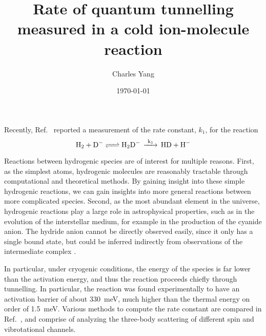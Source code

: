 \documentclass[reprint,aps,prb]{revtex4-2} %
\begin{document}
\title{Rate of quantum tunnelling measured in a cold ion-molecule reaction}
\author{Charles Yang\vspace{-2.6em}}
\noaffiliation{}
\date{\today}
\maketitle


Recently, Ref.~ reported a measurement of the rate constant, \( k_1 \), for the reaction 
\begin{equation}
    \ce{H2 + D- <=> H2D- \overset{k_1}{\ce{->}} HD + H-} \label{eq:rxn}
\end{equation}

Reactions between hydrogenic species are of interest for multiple reasons. First, as the simplest atoms, hydrogenic molecules are reasonably tractable through computational and theoretical methods. By gaining insight into these simple hydrogenic reactions, we can gain insights into more general reactions between more complicated species. Second, as the most abundant element in the universe, hydrogenic reactions play a large role in astrophysical properties, such as in the evolution of the interstellar medium, for example in the production of the cyanide anion\cite{yuen_quantum-tunneling_2018}. The hydride anion  cannot be directly observed easily, since it only has a single bound state, but could be inferred indirectly from observations of the intermediate complex .

In particular, under cryogenic conditions, the energy of the species is far lower than the activation energy, and thus the reaction proceeds chiefly through tunnelling. In particular, the reaction was found experimentally to have an activation barrier of about \SI{330}{meV}, much higher than the thermal energy on order of \SI{1.5}{meV}. Various methods to compute the rate constant are compared in Ref.~\cite{yuen_quantum-tunneling_2018}, and comprise of analyzing the three-body scattering of different spin and vibrotational channels.
\end{document}
